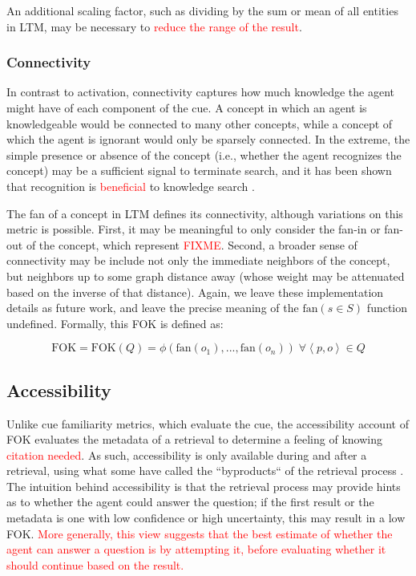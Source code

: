 \documentclass[10pt,letterpaper]{article}
\newcommand{\fixme}[2][]{#2}
\renewcommand{\fixme}[2][]{\textcolor{red}{#2}}
\newcommand{\tuple}[1]{\left \langle #1 \right \rangle }
\newcommand{\fok}[0]{\text{FOK}}
\begin{document}
An additional scaling factor, such as dividing by the sum or mean of all entities in LTM, may be necessary to \fixme{reduce the range of the result}.

\subsubsection{Connectivity}

In contrast to activation, connectivity captures how much knowledge the agent might have of each component of the cue.
A concept in which an agent is knowledgeable would be connected to many other concepts, while a concept of which the agent is ignorant would only be sparsely connected.
In the extreme, the simple presence or absence of the concept (i.e., whether the agent recognizes the concept) may be a sufficient signal to terminate search, and it has been shown that recognition is \fixme{beneficial} to knowledge search \cite{Li2012FunctionalInteractionsBetween}.

The fan of a concept in LTM defines its connectivity, although variations on this metric is possible.
First, it may be meaningful to only consider the fan-in or fan-out of the concept, which represent \fixme{FIXME}.
Second, a broader sense of connectivity may be include not only the immediate neighbors of the concept, but neighbors up to some graph distance away (whose weight may be attenuated based on the inverse of that distance).
Again, we leave these implementation details as future work, and leave the precise meaning of the $\text{fan}(s{\in}S)$ function undefined.
Formally, this FOK is defined as:

$$\fok = \fok(Q) = \phi\left(\text{fan}(o_1), ..., \text{fan}(o_n)\right) \; \forall {\tuple{p, o}{\in}Q}$$

\fixme[Are there other cue-related sources worth mentioning, e.g., recognition?]{}

\subsection{Accessibility}

Unlike cue familiarity metrics, which evaluate the cue, the accessibility account of FOK evaluates the metadata of a retrieval to determine a feeling of knowing \fixme{citation needed}.
As such, accessibility is only available during and after a retrieval, using what some have called the ``byproducts`` of the retrieval process \cite{Koriat1993HowDoWe}.
The intuition behind accessibility is that the retrieval process may provide hints as to whether the agent could answer the question; if the first result or the metadata is one with low confidence or high uncertainty, this may result in a low FOK.
\fixme{More generally, this view suggests that the best estimate of whether the agent can answer a question is by attempting it, before evaluating whether it should continue based on the result.}
\end{document}
